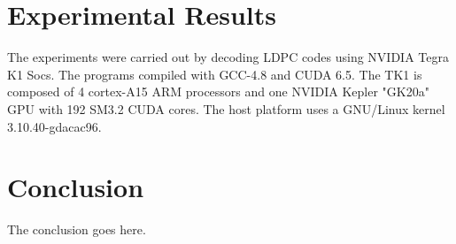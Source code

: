 \documentclass[conference]{IEEEtran}
\begin{document}
\section{Experimental Results} \label{sec4}

The experiments were carried out by decoding LDPC codes using NVIDIA Tegra K1 Socs. The programs compiled with GCC-4.8 and CUDA 6.5. The TK1 is composed of 4 cortex-A15 ARM processors and one NVIDIA Kepler "GK20a" GPU with 192 SM3.2 CUDA cores. The host platform uses a GNU/Linux kernel 3.10.40-gdacac96. 

\section{Conclusion}
The conclusion goes here.

\newpage






\end{document}

